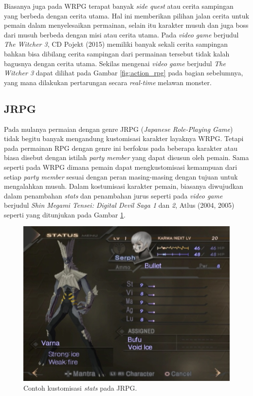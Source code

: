 \begin{subs}
	Biasanya juga pada WRPG terapat banyak \textit{side quest} atau cerita sampingan yang berbeda dengan cerita utama. Hal ini memberikan pilihan jalan cerita untuk pemain dalam menyelesaikan permainan, selain itu karakter musuh dan juga boss dari musuh berbeda dengan misi atau cerita utama. Pada \textit{video game} berjudul \textit{The Witcher 3}, CD Pojekt (2015) memiliki banyak sekali cerita sampingan bahkan bisa dibilang cerita sampingan dari permainan tersebut tidak kalah bagusnya dengan cerita utama. Sekilas mengenai \textit{video game} berjudul \textit{The Witcher 3} dapat dilihat pada Gambar \ref{fig:action_rpg} pada bagian sebelumnya, yang mana dilakukan pertarungan secara \textit{real-time} melawan monster.
	\vspace{1ex}
	
	\subsection{JRPG}
	\label{sec:sub_sec2_jrpg}
	
	Pada mulanya permaian dengan genre JRPG (\textit{Japanese Role-Playing Game}) tidak begitu banyak mengandung kustomisasi karakter layaknya WRPG. Tetapi pada permainan RPG dengan genre ini berfokus pada beberapa karakter atau biasa disebut dengan istilah \textit{party member} yang dapat disusun oleh pemain. Sama seperti pada WRPG dimana pemain dapat mengkustomisasi kemampuan dari setiap \textit{party member} sesuai dengan peran masing-masing dengan tujuan untuk mengalahkan musuh. Dalam kostumisasi karakter pemain, biasanya diwujudkan dalam penambahan \textit{stats} dan penambahan jurus seperti pada \textit{video game} berjudul \textit{Shin Megami Tensei: Digital Devil Saga 1} dan \textit{2}, Atlus (2004, 2005) seperti yang ditunjukan pada Gambar \ref{fig:dds}.
	\vspace{1ex}
	
	\begin{figure} [!h] \centering
		\includegraphics[scale=0.45]{img/dds.jpg}
		\caption{Contoh kustomisasi \textit{stats} pada JRPG.}
		\label{fig:dds}
	\end{figure}
	

\end{subs}

